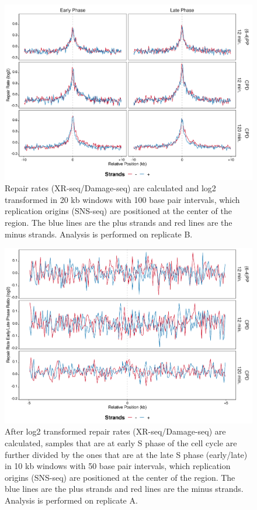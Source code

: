 \begin{figure}[H]
\begin{center}
\includegraphics[width=\textwidth]{Chapters/7_appendix/figures/supfig53}
\caption[Repair rate of replication origins in 20 kb (replicate B).]{Repair rates (XR-seq/Damage-seq) are calculated and log2 transformed in 20 kb windows with 100 base pair intervals, which replication origins (SNS-seq) are positioned at the center of the region. The blue lines are the plus strands and red lines are the minus strands. Analysis is performed on replicate B.}
\label{supfig:rr20snsB}
\end{center}
\end{figure}

\begin{figure}[H]
\begin{center}
\includegraphics[width=\textwidth]{Chapters/7_appendix/figures/supfig54}
\caption[Repair rate early/late ratio of replication origins in 10 kb (replicate A).]{After log2 transformed repair rates (XR-seq/Damage-seq) are calculated, samples that are at early S phase of the cell cycle are further divided by the ones that are at the late S phase (early/late) in 10 kb windows with 50 base pair intervals, which replication origins (SNS-seq) are positioned at the center of the region. The blue lines are the plus strands and red lines are the minus strands. Analysis is performed on replicate A.}
\label{supfig:rrel10snsA}
\end{center}
\end{figure}

